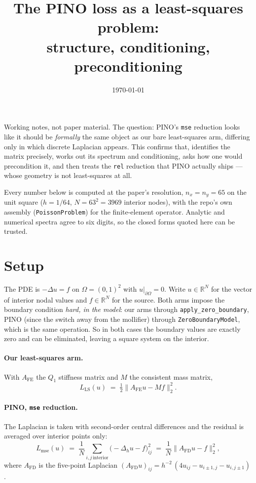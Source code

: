 \documentclass[11pt]{article}
\title{The PINO loss as a least-squares problem:\\ structure, conditioning, preconditioning}
\date{\today}
\newcommand{\Afd}{A_{\mathrm{FD}}}
\newcommand{\Afe}{A_{\mathrm{FE}}}
\newcommand{\R}{\mathbb{R}}
\begin{document}
\maketitle

\noindent
Working notes, not paper material. The question: PINO's \texttt{mse} reduction looks like it should
be \emph{formally} the same object as our bare least-squares arm, differing only in which discrete
Laplacian appears. This confirms that, identifies the matrix precisely, works out its spectrum and
conditioning, asks how one would precondition it, and then treats the \texttt{rel} reduction that
PINO actually ships --- whose geometry is not least-squares at all.

Every number below is computed at the paper's resolution, $n_x=n_y=65$ on the unit square
($h = 1/64$, $N=63^2=3969$ interior nodes), with the repo's own assembly
(\texttt{PoissonProblem}) for the finite-element operator. Analytic and numerical spectra agree to
six digits, so the closed forms quoted here can be trusted.

\section{Setup}

The PDE is $-\Delta u = f$ on $\Omega=(0,1)^2$ with $u|_{\partial\Omega}=0$. Write $u\in\R^N$ for
the vector of interior nodal values and $f\in\R^N$ for the source. Both arms impose the boundary
condition \emph{hard, in the model}: our arms through \texttt{apply\_zero\_boundary}, PINO (since
the switch away from the mollifier) through \texttt{ZeroBoundaryModel}, which is the same
operation. So in both cases the boundary values are exactly zero and can be eliminated, leaving a
square system on the interior.

\paragraph{Our least-squares arm.} With $\Afe$ the $Q_1$ stiffness matrix and $M$ the consistent
mass matrix,
\begin{equation}
  L_{\mathrm{LS}}(u) \;=\; \tfrac12 \bigl\| \Afe u - M f \bigr\|_2^2 .
  \label{eq:ls}
\end{equation}

\paragraph{PINO, \texttt{mse} reduction.} The Laplacian is taken with second-order central
differences and the residual is averaged over interior points only:
\begin{equation}
  L_{\mathrm{mse}}(u)
  \;=\; \frac{1}{N}\sum_{i,j \,\mathrm{interior}} \bigl( -\Delta_h u - f \bigr)_{ij}^2
  \;=\; \frac{1}{N}\bigl\| \Afd u - f \bigr\|_2^2 ,
  \label{eq:mse}
\end{equation}
where $\Afd$ is the five-point Laplacian
$(\Afd u)_{ij} = h^{-2}\,(4u_{ij}-u_{i\pm1,j}-u_{i,j\pm1})$.
\end{document}

